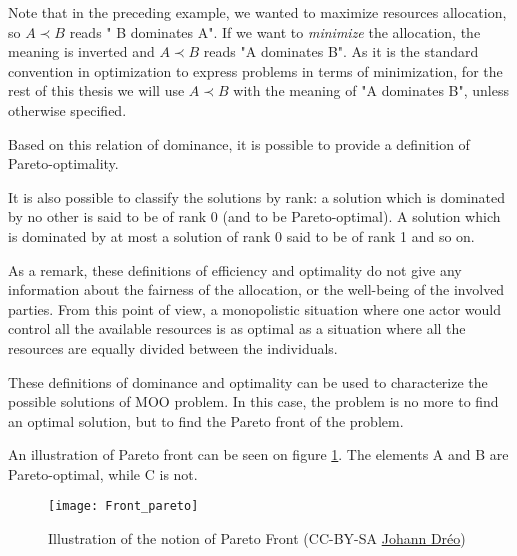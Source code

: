 
Note that in the preceding example, we wanted to maximize resources allocation, so \(A \prec B\) reads " B dominates A". If we want to \emph{minimize} the allocation, the meaning is inverted and  \(A \prec B\) reads "A dominates B".
As it is the standard convention in optimization to express problems in terms of minimization, for the rest of this thesis we will use \(A \prec B\) with the meaning of "A dominates B", unless otherwise specified.

Based on this relation of dominance, it is possible to provide a definition of Pareto-optimality.



It is also possible to classify the solutions by rank: a solution which is dominated by no other is said to be of rank 0 (and to be Pareto-optimal). A solution which is dominated by at most a solution of rank 0 said to be of rank 1 and so on.

As a remark, these definitions of efficiency and optimality do not give any information about the fairness of the allocation, or the well-being of the involved parties. From this point of view, a monopolistic situation where one actor would control all the available resources is as optimal as a situation where all the resources are equally divided between the individuals.

These definitions of dominance and optimality can be used to characterize the possible solutions of MOO problem. In this case, the problem is no more to find an optimal solution, but to find the Pareto front of the problem.

An illustration of Pareto front can be seen on figure \ref{Front_Pareto}. The elements A and B are Pareto-optimal, while C is not.


\begin{figure}
\centering
\texttt{[image: Front\_pareto]}\\
\caption{Illustration of the notion of Pareto Front (CC-BY-SA \href{http://en.wikipedia.org/wiki/File:Front_pareto.svg}{Johann Dréo})}

\label{Front_Pareto}
\end{figure}


